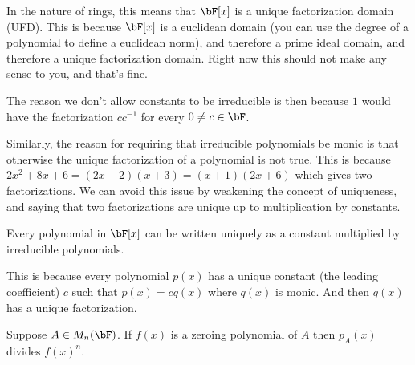 \begin{note}

    In the nature of rings, this means that $\bF[x]$ is a unique factorization domain (UFD).
    This is because $\bF[x]$ is a euclidean domain (you can use the degree of a polynomial to define a euclidean norm), and therefore a prime ideal domain, and therefore a unique factorization domain.
    Right now this should not make any sense to you, and that's fine.

    The reason we don't allow constants to be irreducible is then because $1$ would have the factorization $cc^{-1}$ for every $0\neq c\in\bF$.

    Similarly, the reason for requiring that irreducible polynomials be monic is that otherwise the unique factorization of a polynomial is not true.
    This is because $2x^2+8x+6=(2x+2)(x+3)=(x+1)(2x+6)$ which gives two factorizations.
    We can avoid this issue by weakening the concept of uniqueness, and saying that two factorizations are unique up to multiplication by constants.

\end{note}

\begin{coro*}

    Every polynomial in $\bF[x]$ can be written uniquely as a constant multiplied by irreducible polynomials.

\end{coro*}

This is because every polynomial $p(x)$ has a unique constant (the leading coefficient) $c$ such that $p(x)=cq(x)$ where $q(x)$ is monic.
And then $q(x)$ has a unique factorization.

\begin{thrm*}[charDividesZeroing]

    Suppose $A\in M_n(\bF)$.
    If $f(x)$ is a zeroing polynomial of $A$ then $p_A(x)$ divides $f(x)^n$.

\end{thrm*}

